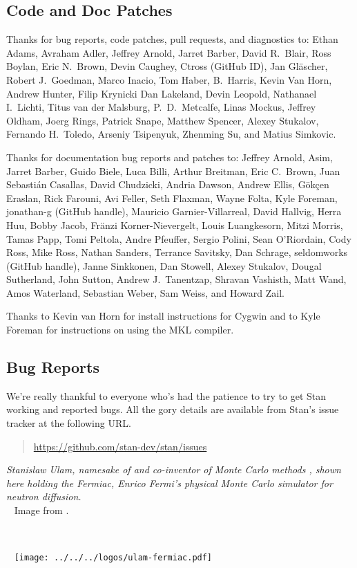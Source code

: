 \subsection*{Code  and Doc Patches}

Thanks for bug reports, code patches, pull requests, and diagnostics
to: 
Ethan Adams, 
Avraham Adler,
Jeffrey Arnold, 
Jarret Barber, 
David R.~Blair, 
Ross Boylan, 
Eric N.~Brown, 
Devin Caughey, 
Ctross (GitHub ID), 
Jan Gl\"ascher,
Robert J.\ Goedman, 
Marco Inacio, 
Tom Haber,
B.~Harris, 
Kevin Van Horn, 
Andrew Hunter, 
Filip Krynicki
Dan Lakeland, 
Devin Leopold, 
Nathanael I.~Lichti,
Titus van der Malsburg,
P.~D.~Metcalfe, 
Linas Mockus,
Jeffrey Oldham, 
Joerg Rings,
Patrick Snape,
Matthew Spencer,
Alexey Stukalov,
Fernando H.~Toledo, 
Arseniy Tsipenyuk,
Zhenming Su,
and Matius Simkovic.

Thanks for documentation bug reports and patches to: 
Jeffrey Arnold,
Asim, 
Jarret Barber, 
Guido Biele,
Luca Billi, 
Arthur Breitman,
Eric C.~Brown, 
Juan Sebasti\'an Casallas,
David Chudzicki,
Andria Dawson, 
Andrew Ellis,
G\"{o}k\c{c}en Eraslan,
Rick Farouni,
Avi Feller,
Seth Flaxman, 
Wayne Folta, 
Kyle Foreman,
jonathan-g (GitHub handle),
Mauricio Garnier-Villarreal,
David Hallvig,
Herra Huu,
Bobby Jacob,
Fr\"anzi Korner-Nievergelt,
Louis Luangkesorn, 
Mitzi Morris,
Tamas Papp, 
Tomi Peltola,
Andre Pfeuffer,
Sergio Polini,
Sean O'Riordain, 
Cody Ross, 
Mike Ross, 
Nathan Sanders, 
Terrance Savitsky,
Dan Schrage,
seldomworks (GitHub handle),
Janne Sinkkonen, 
Dan Stowell, 
Alexey Stukalov,
Dougal Sutherland, 
John Sutton,
Andrew J.~Tanentzap,
Shravan Vashisth, 
Matt Wand,
Amos Waterland,
Sebastian Weber, 
Sam Weiss, and
Howard Zail.

Thanks to Kevin van Horn for install instructions for Cygwin and to
Kyle Foreman for instructions on using the MKL compiler.


\subsection*{Bug Reports}

We're really thankful to everyone who's had the patience to try
to get Stan working and reported bugs.  All the gory details are
available from Stan's issue tracker at the following URL.
%
\begin{quote}
\url{https://github.com/stan-dev/stan/issues}
\end{quote}




\vfill
\begin{center}
\hfill
\begin{minipage}[b]{2in}
  \footnotesize {\it Stanislaw Ulam, namesake of \Stan and co-inventor
    of Monte Carlo methods \citep{MetropolisUlam:1949}, shown here
    holding the Fermiac, Enrico Fermi's physical Monte Carlo simulator
    for neutron diffusion.}
  \\[3pt] \mbox{ } \hfill
  {\scriptsize Image from \citep{Giesler:2000}.}
\end{minipage} \ \ \ \ \ 
\begin{minipage}[b]{1.5in} \mbox{ } \hfill
  \texttt{[image: ../../../logos/ulam-fermiac.pdf]}
\end{minipage} 
\end{center}
